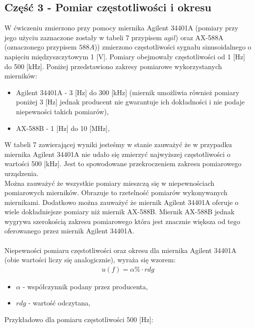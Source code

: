 \documentclass[11pt]{article}
\begin{document}
    \subsection*{Część 3 - Pomiar częstotliwości i okresu}
    W ćwiczeniu zmierzono przy pomocy miernika Agilent 34401A (pomiary przy jego użyciu zaznaczone zostały w tabeli 7 przypisem $agil$) oraz AX-588A (oznaczonego przypisem $588A$)) zmierzono
    częstotliwości sygnału sinusoidalnego o napięciu międzyszczytowym 1 [V]. Pomiary obejmowały częstotliwości od 1 [Hz] do 500 [kHz]. Poniżej przedstawiono zakresy pomiarowe wykorzystanych
    mierników:
    \begin{itemize}
        \item Agilent 34401A - 3 [Hz] do 300 [kHz] (miernik umożliwia również pomiary poniżej 3 [Hz] jednak producent nie gwarantuje ich dokładności i nie podaje niepewności takich pomiarów),
        \item AX-588B - 1 [Hz] do 10 [MHz],
    \end{itemize}
    \par W tabeli 7 zawierającej wyniki jesteśmy w stanie zauważyć że w przypadku miernika Agilent 34401A nie udało się zmierzyć najwyższej częstotliwości o wartości 500 [kHz]. Jest to spowodowane
    przekroczeniem zakresu pomiarowego urządzenia.\\
    \indent Można zauważyć że wszystkie pomiary mieszczą się w niepewnościach pomiarowych mierników. Obrazuje to rzetelność pomiarów wykonywanych miernikami. Dodatkowo można zauważyć
    że miernik Agilent 34401A oferuje o wiele dokładniejsze pomiary niż miernik AX-588B. Miernik AX-588B jednak wygrywa szerokością zakresu pomiarowego która jest znacznie większa od
    tego oferowanego przez miernik Agilent 34401A.\\\\
    \indent Niepewności pomiaru częstotliwości oraz okresu dla miernika Agilent 34401A (obie wartości liczy się analogicznie), wyraża się wzorem:
    \begin{gather*}
        u(f)=\alpha\%\cdot rdg
    \end{gather*}
    {\footnotesize
        \begin{itemize}
            \setlength\itemsep{0em}
            \item[] \boldmath$\alpha$ - współczynnik podany przez producenta,
            \item[] \boldmath$rdg$ - wartość odczytana,
        \end{itemize}}
    \noindent Przykładowo dla pomiaru częstotliwości 500 [Hz]:
\end{document}
